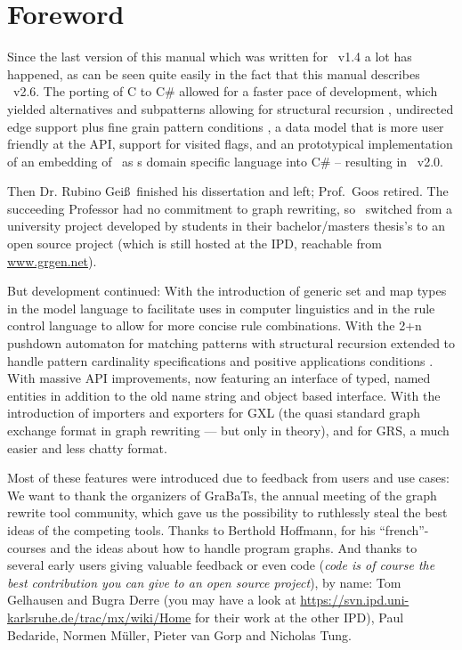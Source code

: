 \chapter*{Foreword}

Since the last version of this manual which was written for \GrG\ v1.4 a lot has happened, 
as can be seen quite easily in the fact that this manual describes \GrG\ v2.6.
The porting of C to C\# \cite{Kro:07} allowed for a faster pace of development,
which yielded alternatives and subpatterns allowing for structural recursion \cite{Jak:08,StructuralRecursion},
undirected edge support plus fine grain pattern conditions \cite{SABuchwald:2008}, 
a data model that is more user friendly at the API, support for visited flags, 
and an prototypical implementation of an embedding of \GrG\ as s domain specific language into C\# \cite{DAMoritz}
-- resulting in \GrG\ v2.0.
\medskip

Then Dr. Rubino Gei\ss~finished his dissertation \cite{DissRuby} and left; Prof.\ Goos retired.
The succeeding Professor had no commitment to graph rewriting,
so \GrG\ switched from a university project developed by students in their bachelor/masters thesis's
to an open source project (which is still hosted at the IPD, reachable from \url{www.grgen.net}).
\medskip

But development continued:
With the introduction of generic set and map types in the model language to facilitate uses in computer linguistics
and in the rule control language to allow for more concise rule combinations.
With the 2+n pushdown automaton for matching patterns with structural recursion extended 
to handle pattern cardinality specifications and positive applications conditions \cite{ExpressiveConvenientFast:2010}.
With massive API improvements, now featuring an interface of typed, named entities in addition to the old name string and object based interface.
With the introduction of importers and exporters for GXL (the quasi standard graph exchange format in graph rewriting --- but only in theory),
and for GRS, a much easier and less chatty format.\smallskip

Most of these features were introduced due to feedback from users and use cases:\\
We want to thank the organizers of GraBaTs\cite{grabats}, the annual meeting of the graph rewrite tool community,
which gave us the possibility to ruthlessly steal the best ideas of the competing tools.
Thanks to Berthold Hoffmann, for his ``french''-courses and the ideas about how to handle program graphs.
And thanks to several early users giving valuable feedback or even code (\emph{code is of course the best contribution you can give to an open source project}), by name: 
Tom Gelhausen and Bugra Derre (you may have a look at \url{https://svn.ipd.uni-karlsruhe.de/trac/mx/wiki/Home} for their work at the other IPD), Paul Bedaride, Normen Müller, Pieter van Gorp and Nicholas Tung.
\\[1ex]

